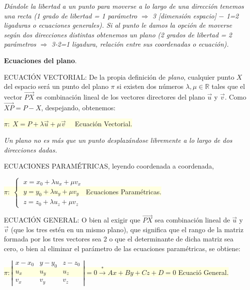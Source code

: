 \justify

\textit{Dándole la libertad a un punto para moverse a lo largo de una dirección tenemos una recta (1 grado de libertad = 1 parámetro $\Rightarrow$ 3 [dimensión espacio] \normalsize{$-$} 1=2 ligaduras o ecuaciones generales). Si al punto le damos la opción de moverse según dos direcciones distintas obtenemos un plano (2 grados de libertad = 2 parámetros $\Rightarrow$ 3-2=1 ligadura, relación entre sus coordenadas o ecuación).}

\textbf{Ecuaciones del plano}.

\vspace{1mm} ECUACIÓN VECTORIAL: De la propia definición de \textit{plano}, cualquier punto $X$ del espacio será un punto del plano $\pi$ si existen dos números $\lambda, \mu \in \mathbb R$ tales que el vector $\overrightarrow{PX}$ es combinación lineal de los vectores directores del plano $\vec u$ y $\vec v$. Como $\overrightarrow{XP}=P-X$, despejando, obtenemos:

\vspace{2mm} \colorbox{LightYellow}{$\pi : \; X=P+\lambda \vec u + \mu \vec v \quad$ Ecuación Vectorial.}
 
\vspace{1mm} \textit{Un plano no es más que un punto desplazándose libremente a lo largo de dos direcciones dadas.}
 
\vspace{1mm} ECUACIONES PARAMÉTRICAS, leyendo coordenada a coordenada,
 
\vspace{2mm} \colorbox{LightYellow}{$\pi : \; \begin{cases} \; x=x_0+\lambda u_x + \mu v_x \\ \; y=y_0+\lambda u_y + \mu v_y  \\ \; z=z_0+\lambda u_z + \mu v_z  \end{cases} $ Ecuaciones Paramétricas.}

\vspace{1mm} ECUACIÓN GENERAL: O bien al exigir que $\overrightarrow{PX}$ sea combinación lineal de $\vec u$ y $\vec v$ (que los tres estén en un mismo plano), que significa que el rango de la matriz formada por los tres vectores sea $2$ o que el determinante de dicha matriz sea cero, o bien al eliminar el parámetro de las ecuaciones paramétricas, se obtiene:

\vspace{1mm} \noindent \colorbox{LightYellow}{\small{$\pi : \left| \begin{matrix} x-x_0&y-y_0&z-z_0\\u_x&u_y&u_z\\v_x&v_y&v_z  \end{matrix} \right|=0 \xrightarrow{*}   Ax+By+Cz+D=0 $ Ecuació General}\normalsize{.}}
 
